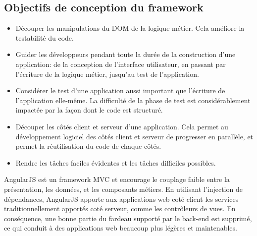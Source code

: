 \subsection{Objectifs de conception du framework}
\begin{itemize}

	\item[\textbullet]
    Découper les manipulations du DOM de la logique métier. Cela améliore la testabilité du code.
    
	\item[\textbullet]
    Guider les développeurs pendant toute la durée de la construction d'une application: de la conception de l'interface utilisateur, en passant par l'écriture de la logique métier, jusqu'au test de l'application.

	\item[\textbullet]
    Considérer le test d'une application aussi important que l'écriture de l'application elle-même. La difficulté de la phase de test est considérablement impactée par la façon dont le code est structuré.

	\item[\textbullet]
    Découper les côtés client et serveur d'une application. Cela permet au développement logiciel des côtés client et serveur de progresser en parallèle, et permet la réutilisation du code de chaque côtés.

	\item[\textbullet]
    Rendre les tâches faciles évidentes et les tâches difficiles possibles.

\end{itemize}

AngularJS est un framework MVC et encourage le couplage faible entre la présentation, les données, et les composants métiers. En utilisant l’injection de dépendances, AngularJS apporte aux applications web coté client les services traditionnellement apportés coté serveur, comme les contrôleurs de vues. En conséquence, une bonne partie du fardeau supporté par le back-end est supprimé, ce qui conduit à des applications web beaucoup plus légères et maintenables.

